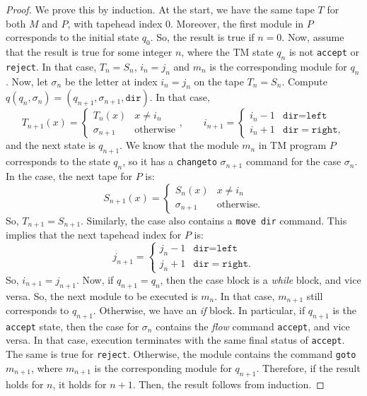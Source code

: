 \documentclass{article}
\theoremstyle{definition}
\begin{document}
    \begin{proof}
        We prove this by induction. At the start, we have the same tape $T$ for both $M$ and $P$, with tapehead index $0$. Moreover, the first module in $P$ corresponds to the initial state $q_0$. So, the result is true if $n = 0$. Now, assume that the result is true for some integer $n$, where the TM state $q_n$ is not \texttt{accept} or \texttt{reject}. In that case, $T_n = S_n$, $i_n = j_n$ and $m_n$ is the corresponding module for $q_n$. Now, let $\sigma_n$ be the letter at index $i_n = j_n$ on the tape $T_n = S_n$. Compute $q(q_n, \sigma_n) = (q_{n+1}, \sigma_{n+1}, \texttt{dir})$. In that case,
        \[T_{n+1}(x) = \begin{cases}
            T_n(x) & x \neq i_n \\
            \sigma_{n+1} & \text{otherwise}
        \end{cases}, \qquad i_{n+1} = \begin{cases}
            i_n - 1 & \texttt{dir} = \texttt{left} \\
            i_n + 1 & \texttt{dir} = \texttt{right},
        \end{cases}\]
        and the next state is $q_{n+1}$. We know that the module $m_n$ in TM program $P$ corresponds to the state $q_n$, so it has a \texttt{changeto} $\sigma_{n+1}$ command for the case $\sigma_n$. In the case, the next tape for $P$ is:
        \[S_{n+1}(x) = \begin{cases}
            S_n(x) & x \neq i_n \\
            \sigma_{n+1} & \text{otherwise}.
        \end{cases}\]
        So, $T_{n+1} = S_{n+1}$. Similarly, the case also contains a \texttt{move dir} command. This implies that the next tapehead index for $P$ is:
        \[j_{n+1} = \begin{cases}
            j_n - 1 & \texttt{dir} = \texttt{left} \\
            j_n + 1 & \texttt{dir} = \texttt{right}.
        \end{cases}\]
        So, $i_{n+1} = j_{n+1}$. Now, if $q_{n+1} = q_n$, then the case block is a \textit{while} block, and vice versa. So, the next module to be executed is $m_n$. In that case, $m_{n+1}$ still corresponds to $q_{n+1}$. Otherwise, we have an \textit{if} block. In particular, if $q_{n+1}$ is the \texttt{accept} state, then the case for $\sigma_n$ contains the \textit{flow} command \texttt{accept}, and vice versa. In that case, execution terminates with the same final status of \texttt{accept}. The same is true for \texttt{reject}. Otherwise, the module contains the command \texttt{goto} $m_{n+1}$, where $m_{n+1}$ is the corresponding module for $q_{n+1}$. Therefore, if the result holds for $n$, it holds for $n+1$. Then, the result follows from induction.
    \end{proof}
\end{document}
